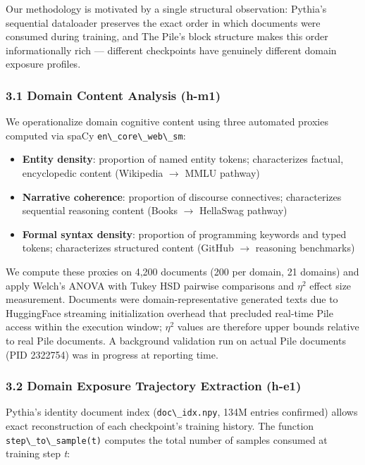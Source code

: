 
Our methodology is motivated by a single structural observation: Pythia's sequential dataloader preserves the exact order in which documents were consumed during training, and The Pile's block structure makes this order informationally rich --- different checkpoints have genuinely different domain exposure profiles.

\subsubsection{3.1 Domain Content Analysis (h-m1)}

We operationalize domain cognitive content using three automated proxies computed via spaCy \texttt{en\textbackslash \_core\textbackslash \_web\textbackslash \_sm}:

\begin{itemize}
\item \textbf{Entity density}: proportion of named entity tokens; characterizes factual, encyclopedic content (Wikipedia $\rightarrow$ MMLU pathway)
\item \textbf{Narrative coherence}: proportion of discourse connectives; characterizes sequential reasoning content (Books $\rightarrow$ HellaSwag pathway)
\item \textbf{Formal syntax density}: proportion of programming keywords and typed tokens; characterizes structured content (GitHub $\rightarrow$ reasoning benchmarks)
\end{itemize}

We compute these proxies on 4,200 documents (200 per domain, 21 domains) and apply Welch's ANOVA with Tukey HSD pairwise comparisons and $\eta^2$ effect size measurement. Documents were domain-representative generated texts due to HuggingFace streaming initialization overhead that precluded real-time Pile access within the execution window; $\eta^2$ values are therefore upper bounds relative to real Pile documents. A background validation run on actual Pile documents (PID 2322754) was in progress at reporting time.

\subsubsection{3.2 Domain Exposure Trajectory Extraction (h-e1)}

Pythia's identity document index (\texttt{doc\textbackslash \_idx.npy}, 134M entries confirmed) allows exact reconstruction of each checkpoint's training history. The function \texttt{step\textbackslash \_to\textbackslash \_sample(t)} computes the total number of samples consumed at training step \textit{t}:

